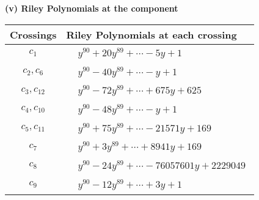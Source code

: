 \documentclass[1p]{elsarticle_modified}
\theoremstyle{definition}
\begin{document}
\newpage\renewcommand{\arraystretch}{1}
\flushleft \textbf{(v) Riley Polynomials at the component}\newline \\
\begin{tabular}{m{50pt}|m{274pt}}
Crossings & \hspace{64pt}Riley Polynomials at each crossing \\
\hline $$\begin{aligned}c_{1}\end{aligned}$$&$\begin{aligned}
&y^{90}+20 y^{89}+\cdots-5 y+1
\end{aligned}$\\
\hline $$\begin{aligned}c_{2},c_{6}\end{aligned}$$&$\begin{aligned}
&y^{90}-40 y^{89}+\cdots- y+1
\end{aligned}$\\
\hline $$\begin{aligned}c_{3},c_{12}\end{aligned}$$&$\begin{aligned}
&y^{90}-72 y^{89}+\cdots+675 y+625
\end{aligned}$\\
\hline $$\begin{aligned}c_{4},c_{10}\end{aligned}$$&$\begin{aligned}
&y^{90}-48 y^{89}+\cdots- y+1
\end{aligned}$\\
\hline $$\begin{aligned}c_{5},c_{11}\end{aligned}$$&$\begin{aligned}
&y^{90}+75 y^{89}+\cdots-21571 y+169
\end{aligned}$\\
\hline $$\begin{aligned}c_{7}\end{aligned}$$&$\begin{aligned}
&y^{90}+3 y^{89}+\cdots+8941 y+169
\end{aligned}$\\
\hline $$\begin{aligned}c_{8}\end{aligned}$$&$\begin{aligned}
&y^{90}-24 y^{89}+\cdots-76057601 y+2229049
\end{aligned}$\\
\hline $$\begin{aligned}c_{9}\end{aligned}$$&$\begin{aligned}
&y^{90}-12 y^{89}+\cdots+3 y+1
\end{aligned}$\\
\hline
\end{tabular}\\~\\
\end{document}
